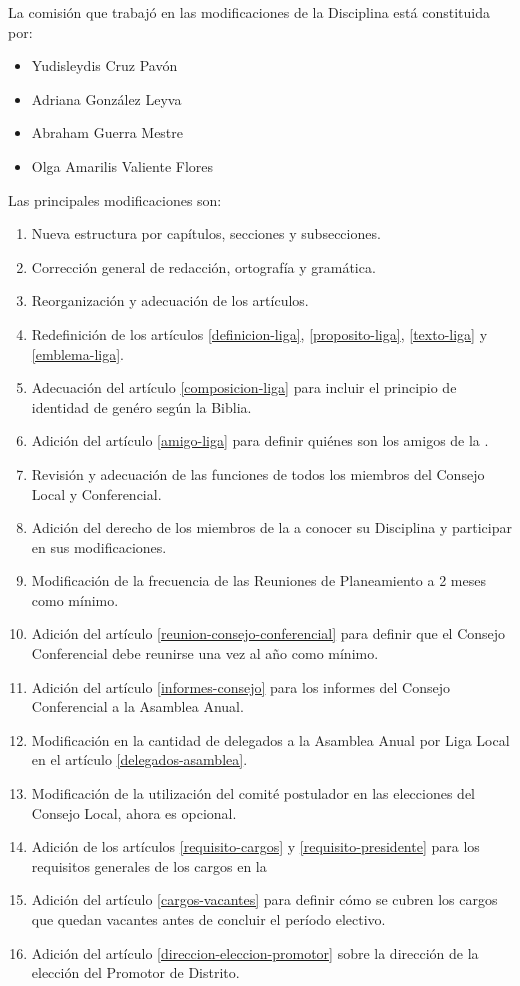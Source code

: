 
La comisión que trabajó en las modificaciones de la Disciplina está constituida por:
\begin{itemize}
    \item Yudisleydis Cruz Pavón
    \item Adriana González Leyva
    \item Abraham Guerra Mestre
    \item Olga Amarilis Valiente Flores
\end{itemize}

Las principales modificaciones son:
\begin{enumerate}
    \item Nueva estructura por capítulos, secciones y subsecciones.
    \item Corrección general de redacción, ortografía y gramática.
    \item Reorganización y adecuación de los artículos.
    \item Redefinición de los artículos \ref{definicion-liga}, \ref{proposito-liga}, \ref{texto-liga} y \ref{emblema-liga}.
    \item Adecuación del artículo \ref{composicion-liga} para incluir el principio de identidad de genéro según la Biblia.
    \item Adición del artículo \ref{amigo-liga} para definir quiénes son los amigos de la \LMJ{}.
    \item Revisión y adecuación de las funciones de todos los miembros del Consejo Local y Conferencial.
    \item Adición del derecho de los miembros de la \LMJ{} a conocer su Disciplina y participar en sus modificaciones.
    \item Modificación de la frecuencia de las Reuniones de Planeamiento a 2 meses como mínimo.
    \item Adición del artículo \ref{reunion-consejo-conferencial} para definir que el Consejo Conferencial debe reunirse una vez al año como mínimo.
    \item Adición del artículo \ref{informes-consejo} para los informes del Consejo Conferencial a la Asamblea Anual.
    \item Modificación en la cantidad de delegados a la Asamblea Anual por Liga Local en el artículo \ref{delegados-asamblea}.
    \item Modificación de la utilización del comité postulador en las elecciones del Consejo Local, ahora es opcional.
    \item Adición de los artículos \ref{requisito-cargos} y \ref{requisito-presidente} para los requisitos generales de los cargos en la \LMJ{}
    \item Adición del artículo \ref{cargos-vacantes} para definir cómo se cubren los cargos que quedan vacantes antes de concluir el período electivo.
    \item Adición del artículo \ref{direccion-eleccion-promotor} sobre la dirección de la elección del Promotor de Distrito.
\end{enumerate}
